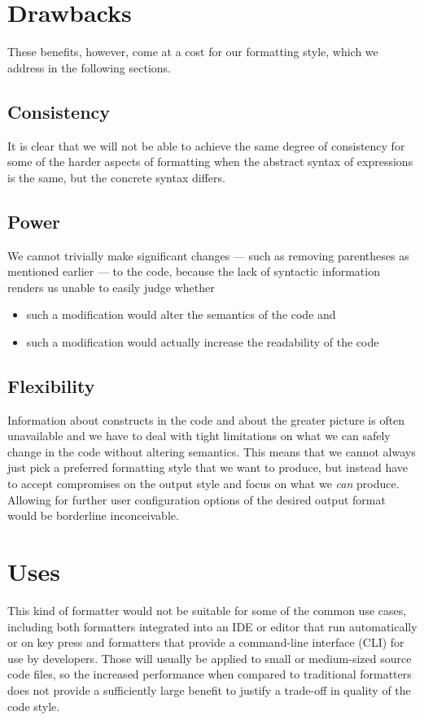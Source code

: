 \section{Drawbacks}
These benefits, however, come at a cost for our formatting style,
which we address in the following sections.

\subsection{Consistency}
It is clear that we will not be able to achieve the same degree of consistency
for some of the harder aspects of formatting
when the abstract syntax of expressions is the same,
but the concrete syntax differs.

\subsection{Power}
We cannot trivially make significant changes --- such as removing parentheses as mentioned earlier ---
to the code, because the lack of syntactic information renders us unable to easily judge whether
\begin{itemize}
  \item such a modification would alter the semantics of the code and
  \item such a modification would actually increase the readability of the code
\end{itemize}

\subsection{Flexibility}
Information about constructs in the code and about the greater picture is often unavailable and
we have to deal with tight limitations on what we can safely change in the code without altering semantics.
This means that we cannot always just pick a preferred formatting style that we want to produce,
but instead have to accept compromises on the output style and focus on what we \textit{can} produce.
Allowing for further user configuration options of the desired output format would be borderline inconceivable.

\section{Uses}
This kind of formatter would not be suitable for some of the common use cases, including both
formatters integrated into an IDE or editor that run automatically or on key press and
formatters that provide a command-line interface (CLI) for use by developers.
Those will usually be applied to small or medium-sized source code files,
so the increased performance when compared to traditional formatters does not provide
a sufficiently large benefit to justify a trade-off in quality of the code style.

